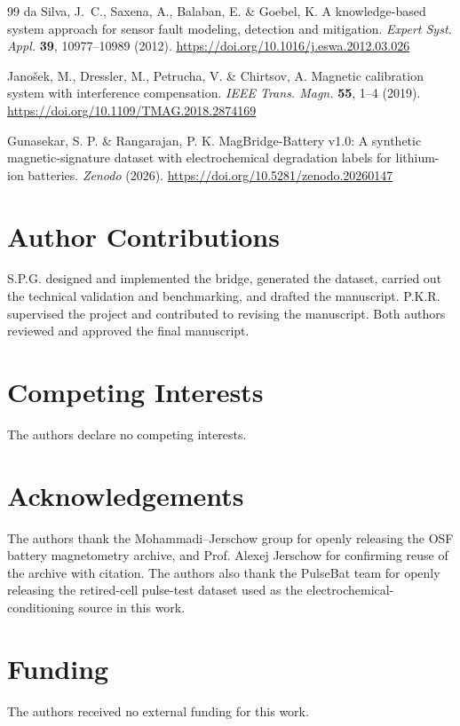 \documentclass[11pt]{article}
\begin{document}
\begin{thebibliography}{99}
da Silva, J.~C., Saxena, A., Balaban, E. \& Goebel, K.
A knowledge-based system approach for sensor fault modeling, detection and
mitigation.
\emph{Expert Syst. Appl.} \textbf{39}, 10977--10989 (2012).
\url{https://doi.org/10.1016/j.eswa.2012.03.026}

Jano\v{s}ek, M., Dressler, M., Petrucha, V. \& Chirtsov, A.
Magnetic calibration system with interference compensation.
\emph{IEEE Trans. Magn.} \textbf{55}, 1--4 (2019).
\url{https://doi.org/10.1109/TMAG.2018.2874169}

Gunasekar, S. P. \& Rangarajan, P. K.
MagBridge-Battery v1.0: A synthetic magnetic-signature dataset
with electrochemical degradation labels for lithium-ion batteries.
\emph{Zenodo} (2026).
\url{https://doi.org/10.5281/zenodo.20260147}

\end{thebibliography}

\section*{Author Contributions}

S.P.G. designed and implemented the bridge, generated the dataset, carried
out the technical validation and benchmarking, and drafted the manuscript.
P.K.R. supervised the project and contributed to revising the manuscript.
Both authors reviewed and approved the final manuscript.

\section*{Competing Interests}

The authors declare no competing interests.

\section*{Acknowledgements}

The authors thank the Mohammadi--Jerschow group for openly releasing the
OSF battery magnetometry archive, and Prof. Alexej Jerschow for confirming
reuse of the archive with citation. The authors also thank the PulseBat team
for openly releasing the retired-cell pulse-test dataset used as the
electrochemical-conditioning source in this work.

\section*{Funding}

The authors received no external funding for this work.
\end{document}
